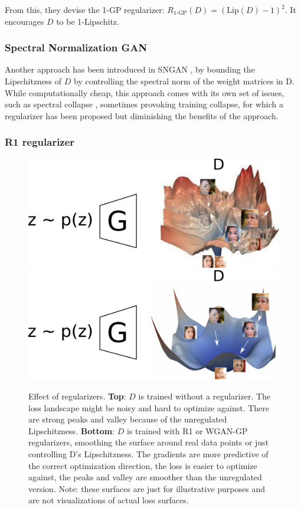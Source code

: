 From this, they devise the 1-GP regularizer: $R_\text{1-GP}(D) = (\text{Lip}(D) - 1)^2$. It encourages $D$ to be 1-Lipschitz.

\subsubsection{Spectral Normalization \ac{GAN}}

Another approach has been introduced in SNGAN \citep{SNGAN}, by bounding the Lipschitzness of $D$ by controlling the spectral norm of the weight matrices in D. While computationally cheap, this approach comes with its own set of issues, such as spectral collapse \citep{biggan}, sometimes provoking training collapse, for which a regularizer has been proposed \citep{spectralcollapse} but diminishing the benefits of the approach.

\subsubsection{R1 regularizer}

\begin{figure}[ht]
    \centering
    \includegraphics[scale=0.6]{60-files/gan-as-loss-bad.pdf}
    \includegraphics[scale=0.6]{60-files/gan-as-loss.pdf}
    \caption{Effect of regularizers. \textbf{Top}: $D$ is trained without a regularizer. The loss landscape might be noisy and hard to optimize against. There are strong peaks and valley because of the unregulated Lipschitzness. \textbf{Bottom}: $D$ is trained with R1 or \ac{WGAN-GP} regularizers, smoothing the surface around real data points or just controlling D's Lipschitzness. The gradients are more predictive of the correct optimization direction, the loss is easier to optimize against, the peaks and valley are smoother than the unregulated version. Note: these surfaces are just for illustrative purposes and are not visualizations of actual loss surfaces.}
    \label{fig:gan-lipschitz}
\end{figure}

